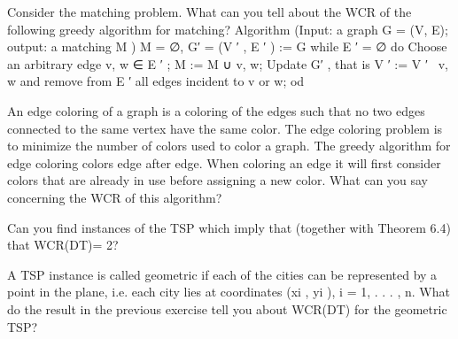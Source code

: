 \begin{exercise}
Consider the matching problem. What can you tell about the WCR of the following greedy algorithm
for matching?
Algorithm (Input: a graph G = (V, E); output: a matching M )
M = ∅, G′ = (V ′ , E ′ ) := G
while E ′ = ∅
do
Choose an arbitrary edge {v, w} ∈ E ′ ;
M := M ∪ {v, w};
Update G′ , that is V ′ := V ′ \ {v, w} and remove from E ′ all edges incident to v or w;
od
\end{exercise}

\begin{exercise}
An edge coloring of a graph is a coloring of the edges such that no two edges connected to the same
vertex have the same color. The edge coloring problem is to minimize the number of colors used to color
a graph. The greedy algorithm for edge coloring colors edge after edge. When coloring an edge it will
first consider colors that are already in use before assigning a new color. What can you say concerning
the WCR of this algorithm?
\end{exercise}

\begin{exercise}
Can you find instances of the TSP which imply that (together with Theorem 6.4) that WCR(DT)= 2?
\end{exercise}

\begin{exercise}
A TSP instance is called geometric if each of the cities can be represented by a point in the plane, i.e.
each city lies at coordinates (xi , yi ), i = 1, . . . , n. What do the result in the previous exercise tell you
about WCR(DT) for the geometric TSP?
\end{exercise}
